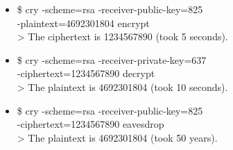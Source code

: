 \documentclass{beamer}
\title{\deliv{\pp}{Presentation}}
\begin{document}
\maketitle


\begin{frame}
\begin{itemize}
\item \alice
  \begin{codes}
  \$ cry -scheme=rsa -receiver-public-key=825 \\
  -plaintext=4692301804 encrypt \\
  > The ciphertext is 1234567890 (took 5 seconds).
  \end{codes}
\item \bob
  \begin{codes}
  \$ cry -scheme=rsa -receiver-private-key=637 \\
  -ciphertext=1234567890 decrypt \\
  > The plaintext is 4692301804 (took 10 seconds).
  \end{codes}
\item \eve
  \begin{codes}
  \$ cry -scheme=rsa -receiver-public-key=825 \\
  -ciphertext=1234567890 eavesdrop \\
  > The plaintext is 4692301804 (took 50 years).
  \end{codes}
\end{itemize}
\end{frame}

\end{document}
